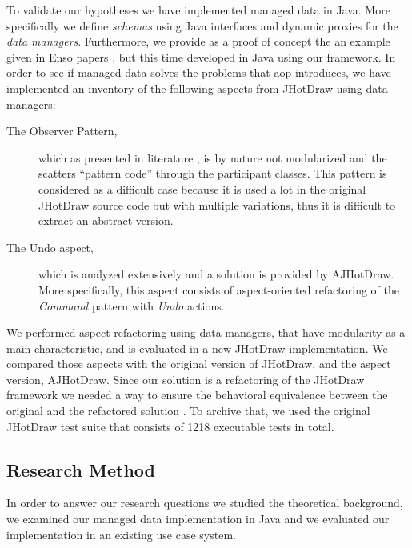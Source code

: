 To validate our hypotheses we have implemented managed data in Java.
More specifically we define \textit{schemas} using Java interfaces and dynamic proxies for the \textit{data managers}. 
Furthermore, we provide as a proof of concept the an example given in Enso papers \cite{loh2012managed}, but this time developed in Java using our framework. 
In order to see if managed data solves the problems that \ac{aop} introduces, we have implemented an inventory of the following aspects from JHotDraw using data managers:
\begin{description}

  \item[The Observer Pattern,]  which as presented in literature \cite{tourwe2003existence} \cite{hannemann2005role} \cite{marin2005approach}, is by nature not modularized and the scatters ``pattern code'' through the participant classes. 
  This pattern is considered as a difficult case because it is used a lot in the original JHotDraw source code but with multiple variations, thus it is difficult to extract an abstract version.

  \item[The Undo aspect,] which is analyzed extensively \cite{marin2004refactoring} and a solution is provided by AJHotDraw. 
  More specifically, this aspect consists of aspect-oriented refactoring of the \textit{Command} pattern with \textit{Undo} actions.

\end{description}

We performed aspect refactoring using data managers, that have modularity as a main characteristic, and is evaluated in a new JHotDraw implementation.
We compared those aspects with the original version of JHotDraw, and the aspect version, AJHotDraw. 
Since our solution is a refactoring of the JHotDraw framework we needed a way to ensure the behavioral equivalence between the original and the refactored solution \cite{fowler2009refactoring}.
To archive that, we used the original JHotDraw test suite that consists of 1218 executable tests in total.

\subsection{Research Method}\label{Research Method}
In order to answer our research questions we studied the theoretical background, we examined our managed data implementation in Java and we evaluated our implementation in an existing use case system.

